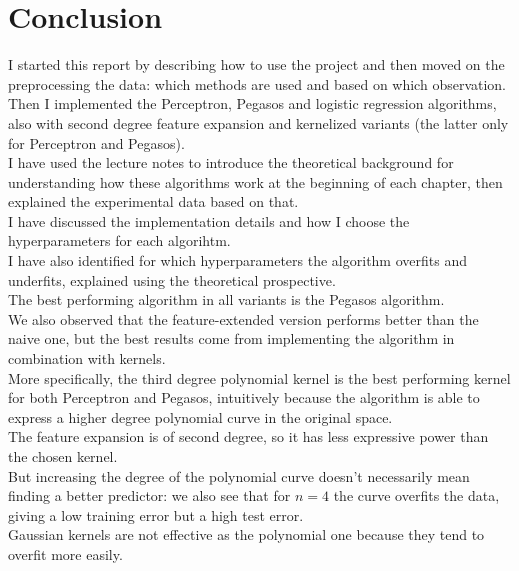 \newpage

\section{Conclusion}
I started this report by describing how to use the project and then moved on the preprocessing the data: which methods are used and based on which observation.\\
Then I implemented the Perceptron, Pegasos and logistic regression algorithms, also with second degree feature expansion and kernelized variants (the latter only for Perceptron and Pegasos).\\
I have used the lecture notes to introduce the theoretical background for understanding how these algorithms work at the beginning of each chapter, then explained the experimental data based on that.\\
I have discussed the implementation details and how I choose the hyperparameters for each algorihtm.\\
I have also identified for which hyperparameters the algorithm overfits and underfits, explained using the theoretical prospective.\\
The best performing algorithm in all variants is the Pegasos algorithm.\\
We also observed that the feature-extended version performs better than the naive one, but the best results come from implementing the algorithm in combination with kernels.\\
More specifically, the third degree polynomial kernel is the best performing kernel for both Perceptron and Pegasos, intuitively because the algorithm is able to express a higher degree polynomial curve in the original space.\\
The feature expansion is of second degree, so it has less expressive power than the chosen kernel.\\
But increasing the degree of the polynomial curve doesn't necessarily mean finding a better predictor: we also see that for $n = 4$ the curve overfits the data, giving a low training error but a high test error.\\
Gaussian kernels are not effective as the polynomial one because they tend to overfit more easily.\\

